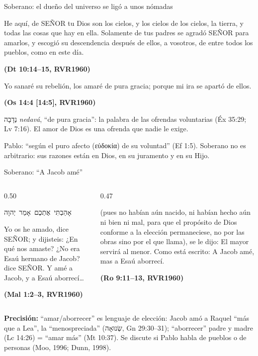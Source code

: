 \documentclass[hyperref={bookmarks=false},aspectratio=169]{beamer}
\newcommand{\heb}[1]{\mbox{\foreignlanguage{hebrew}{#1}}}
\newcommand{\grc}[1]{\foreignlanguage{ancientgreek}{#1}}
\newcommand{\SENOR}{S{\fontsize{0.78em}{1em}\selectfont EÑOR}}
\newcommand{\fuente}[1]{\par\hfill{\upshape\bfseries\footnotesize\textcolor{azul}{#1}}}
\newcommand{\precision}[1]{{\footnotesize\color{gris}\textbf{Precisión:} #1}}
\begin{document}
\begin{frame}{Soberano: el dueño del universo se ligó a unos nómadas}
\begin{cita}He aquí, de \SENOR{} tu Dios son los cielos, y los cielos de los cielos, la tierra, y todas las cosas que hay en ella. Solamente de tus padres se agradó \SENOR{} para amarlos, y escogió su descendencia después de ellos, a vosotros, de entre todos los pueblos, como en este día.\fuente{(Dt 10:14--15, RVR1960)}\end{cita}
\begin{cita}Yo sanaré su rebelión, los amaré de pura gracia; porque mi ira se apartó de ellos.\fuente{(Os 14:4 [14:5], RVR1960)}\end{cita}
\small\heb{נְדָבָה} \emph{nedavá}, ``de pura gracia'': la palabra de las ofrendas voluntarias (Éx 35:29; Lv 7:16). El amor de Dios es una ofrenda que nadie le exige.\par\smallskip
\scriptsize Pablo: ``según el puro afecto (\grc{εὐδοκία}) de su voluntad'' (Ef 1:5). Soberano no es arbitrario: sus razones están en Dios, en su juramento y en su Hijo.
\end{frame}

\begin{frame}{Soberano: ``A Jacob amé''}
\begin{columns}[t,onlytextwidth]
\begin{column}{0.50\textwidth}
\begin{center}\heb{אָהַבְתִּי אֶתְכֶם אָמַר יְהוָה}\end{center}
\begin{cita}Yo os he amado, dice \SENOR; y dijisteis: ¿En qué nos amaste? ¿No era Esaú hermano de Jacob? dice \SENOR. Y amé a Jacob, y a Esaú aborrecí\ldots\fuente{(Mal 1:2--3, RVR1960)}\end{cita}
\end{column}
\begin{column}{0.47\textwidth}
\begin{cita}(pues no habían aún nacido, ni habían hecho aún ni bien ni mal, para que el propósito de Dios conforme a la elección permaneciese, no por las obras sino por el que llama), se le dijo: El mayor servirá al menor. Como está escrito: A Jacob amé, mas a Esaú aborrecí.\fuente{(Ro 9:11--13, RVR1960)}\end{cita}
\end{column}
\end{columns}
\precision{``amar/aborrecer'' es lenguaje de elección: Jacob amó a Raquel ``más que a Lea'', la ``menospreciada'' (\heb{שְׂנוּאָה}, Gn 29:30--31); ``aborrecer'' padre y madre (Lc 14:26) = ``amar más'' (Mt 10:37). Se discute si Pablo habla de pueblos o de personas (Moo, 1996; Dunn, 1998).}
\end{frame}
\end{document}

